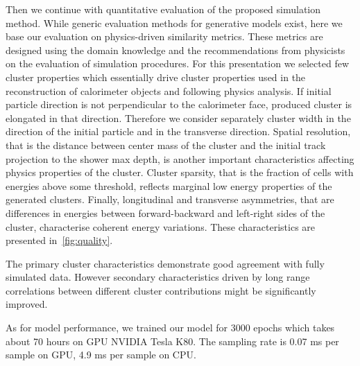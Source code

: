Then we continue with quantitative evaluation of the proposed simulation
method. While generic evaluation methods for generative models exist,
here we base our evaluation on physics-driven similarity
metrics. These metrics are designed using the domain knowledge and the
recommendations from physicists on the evaluation of simulation
procedures. 
For this presentation we selected few cluster properties which essentially
drive cluster properties used in the reconstruction of calorimeter objects
and following physics analysis. If initial particle direction is not
perpendicular to the calorimeter face, produced cluster is elongated
in that direction. Therefore we consider separately cluster width in
the direction of the initial particle and in the transverse
direction. Spatial resolution, that is the distance between center
mass of the cluster and the initial track projection to the shower max
depth, is another important characteristics affecting physics
properties of the cluster. Cluster sparsity, that is the fraction of
cells with energies above some threshold, reflects marginal low
energy properties of the generated clusters. Finally, longitudinal and
transverse asymmetries, that are differences in energies between
forward-backward and left-right sides of the cluster, characterise
coherent energy variations.  
 These  characteristics are presented in~\cref{fig:quality}. 

The primary cluster characteristics  demonstrate good agreement with
fully simulated data. However secondary characteristics driven by
long range correlations between different cluster contributions might
be significantly improved.  




As for model performance, we trained our model for 3000 epochs which takes about 70 hours on GPU NVIDIA Tesla K80. The sampling rate is 0.07 ms per sample on GPU, 4.9 ms per sample on CPU.
